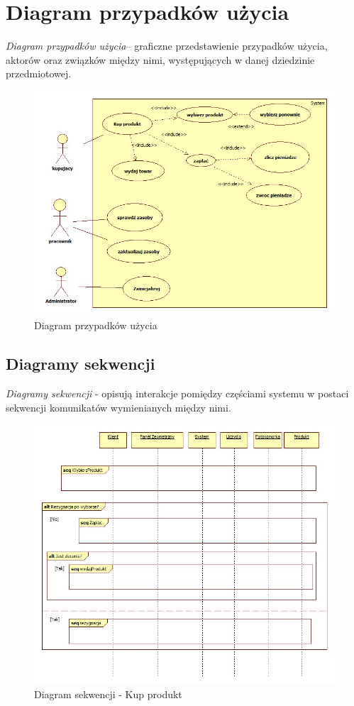 \documentclass[a4paper, 11pt]{article}
\begin{document}
\newpage
\section{Diagram przypadków użycia}
\emph{Diagram przypadków użycia}– graficzne przedstawienie przypadków użycia, aktorów oraz związków między nimi, występujących w danej dziedzinie przedmiotowej.

\begin{figure}[H]
\centerline{\includegraphics[scale=0.6]{../Diagrams/Main}}
\caption{Diagram przypadków użycia}
\end{figure}%

\newpage
\subsection{Diagramy sekwencji}
\emph{Diagramy sekwencji} - opisują interakcje pomiędzy częściami systemu w postaci sekwencji komunikatów wymienianych między nimi.\\[1cm] 


\begin{figure}[H]
\centerline{\includegraphics[scale=0.7]{../Diagrams/kupProdukt}}
\caption{Diagram sekwencji - Kup produkt}
\end{figure}
\end{document}
